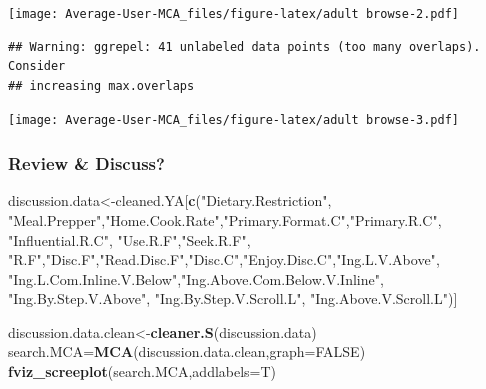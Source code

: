 \documentclass[
]{article}
\newenvironment{Shaded}{\begin{snugshade}}{\end{snugshade}}
\newcommand{\DataTypeTok}[1]{\textcolor[rgb]{0.13,0.29,0.53}{#1}}
\newcommand{\KeywordTok}[1]{\textcolor[rgb]{0.13,0.29,0.53}{\textbf{#1}}}
\newcommand{\NormalTok}[1]{#1}
\newcommand{\OtherTok}[1]{\textcolor[rgb]{0.56,0.35,0.01}{#1}}
\newcommand{\StringTok}[1]{\textcolor[rgb]{0.31,0.60,0.02}{#1}}
\begin{document}
\texttt{[image: Average-User-MCA\_files/figure-latex/adult browse-2.pdf]}

\begin{Shaded}
\end{Shaded}

\begin{verbatim}
## Warning: ggrepel: 41 unlabeled data points (too many overlaps). Consider
## increasing max.overlaps
\end{verbatim}

\texttt{[image: Average-User-MCA\_files/figure-latex/adult browse-3.pdf]}

\hypertarget{review-discuss-2}{%
\subsubsection{Review \& Discuss?}\label{review-discuss-2}}

\begin{Shaded}
\begin{Highlighting}[]
\NormalTok{discussion.data<-cleaned.YA[}\KeywordTok{c}\NormalTok{(}\StringTok{"Dietary.Restriction"}\NormalTok{, }\StringTok{"Meal.Prepper"}\NormalTok{,}\StringTok{"Home.Cook.Rate"}\NormalTok{,}\StringTok{"Primary.Format.C"}\NormalTok{,}\StringTok{"Primary.R.C"}\NormalTok{, }\StringTok{"Influential.R.C"}\NormalTok{, }
            \StringTok{"Use.R.F"}\NormalTok{,}\StringTok{"Seek.R.F"}\NormalTok{, }\StringTok{"R.F"}\NormalTok{,}\StringTok{"Disc.F"}\NormalTok{,}\StringTok{"Read.Disc.F"}\NormalTok{,}\StringTok{"Disc.C"}\NormalTok{,}\StringTok{"Enjoy.Disc.C"}\NormalTok{,}\StringTok{"Ing.L.V.Above"}\NormalTok{,}
            \StringTok{"Ing.L.Com.Inline.V.Below"}\NormalTok{,}\StringTok{"Ing.Above.Com.Below.V.Inline"}\NormalTok{,  }\StringTok{"Ing.By.Step.V.Above"}\NormalTok{,  }\StringTok{"Ing.By.Step.V.Scroll.L"}\NormalTok{,}
            \StringTok{"Ing.Above.V.Scroll.L"}\NormalTok{)]}

\NormalTok{discussion.data.clean<-}\KeywordTok{cleaner.S}\NormalTok{(discussion.data)}
\NormalTok{search.MCA=}\KeywordTok{MCA}\NormalTok{(discussion.data.clean,}\DataTypeTok{graph=}\OtherTok{FALSE}\NormalTok{)}
\KeywordTok{fviz_screeplot}\NormalTok{(search.MCA,}\DataTypeTok{addlabels=}\NormalTok{T)}
\end{Highlighting}
\end{Shaded}
\end{document}
